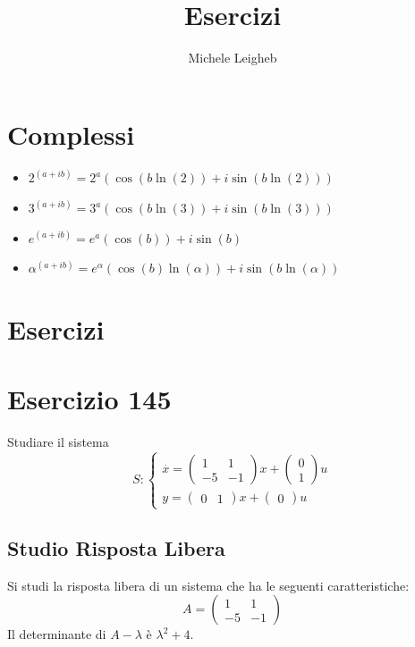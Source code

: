 \documentclass{article}
\title{Esercizi}
\author{Michele Leigheb}
\date{}
\begin{document}
\maketitle
\tableofcontents{}
\section{Complessi}
\begin{itemize}
	\item \(\displaystyle 2^{(a+ib)} = 2^a (\cos(b \ln(2)) + i\sin(b \ln(2))) \)
	\item \(\displaystyle 3^{(a+ib)} = 3^a (\cos(b \ln(3)) + i\sin(b \ln(3))) \)
	\item \(\displaystyle e^{(a+ib)} = e^a (\cos(b)) + i\sin(b) \)
	\item \(\displaystyle \alpha^{(a+ib)} = e^{\alpha} (\cos(b)\ln(\alpha)) + i\sin(b\ln(\alpha)) \)
\end{itemize}



\section{Esercizi}

\section{Esercizio 145 }
 Studiare il sistema \[S:\begin{cases}\overset{\cdot}{x} = \left(\begin{matrix}1 & 1\\-5 & -1\end{matrix}\right) x+ \left(\begin{matrix}0\\1\end{matrix}\right)u\\y = \left(\begin{matrix}0 & 1\end{matrix}\right) x +\left(\begin{matrix}0\end{matrix}\right) u\end{cases}\]\subsection{Studio Risposta Libera}
Si studi la risposta libera di un sistema che ha le seguenti caratteristiche: \[A = \left(\begin{matrix}1 & 1\\-5 & -1\end{matrix}\right)\]
Il determinante di $A-\lambda$ è $ \lambda^{2} + 4 $.
\end{document}
